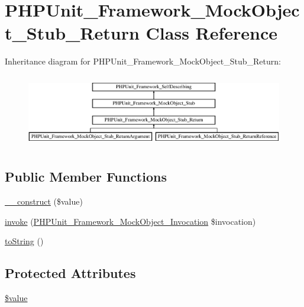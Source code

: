 \hypertarget{class_p_h_p_unit___framework___mock_object___stub___return}{}\section{P\+H\+P\+Unit\+\_\+\+Framework\+\_\+\+Mock\+Object\+\_\+\+Stub\+\_\+\+Return Class Reference}
\label{class_p_h_p_unit___framework___mock_object___stub___return}
Inheritance diagram for P\+H\+P\+Unit\+\_\+\+Framework\+\_\+\+Mock\+Object\+\_\+\+Stub\+\_\+\+Return\+:\begin{figure}[H]
\begin{center}
\leavevmode
\includegraphics[height=3.236994cm]{class_p_h_p_unit___framework___mock_object___stub___return}
\end{center}
\end{figure}
\subsection*{Public Member Functions}
\begin{DoxyCompactItemize}
\item 
\mbox{\hyperlink{class_p_h_p_unit___framework___mock_object___stub___return_a7e17a19b592345a03763f050fffe0ce7}{\+\_\+\+\_\+construct}} (\$value)
\item 
\mbox{\hyperlink{class_p_h_p_unit___framework___mock_object___stub___return_af2fc26e6704e08d95f2ea1d9c5ffb865}{invoke}} (\mbox{\hyperlink{interface_p_h_p_unit___framework___mock_object___invocation}{P\+H\+P\+Unit\+\_\+\+Framework\+\_\+\+Mock\+Object\+\_\+\+Invocation}} \$invocation)
\item 
\mbox{\hyperlink{class_p_h_p_unit___framework___mock_object___stub___return_a5558c5d549f41597377fa1ea8a1cefa3}{to\+String}} ()
\end{DoxyCompactItemize}
\subsection*{Protected Attributes}
\begin{DoxyCompactItemize}
\item 
\mbox{\hyperlink{class_p_h_p_unit___framework___mock_object___stub___return_a0f298096f322952a72a50f98a74c7b60}{\$value}}
\end{DoxyCompactItemize}


